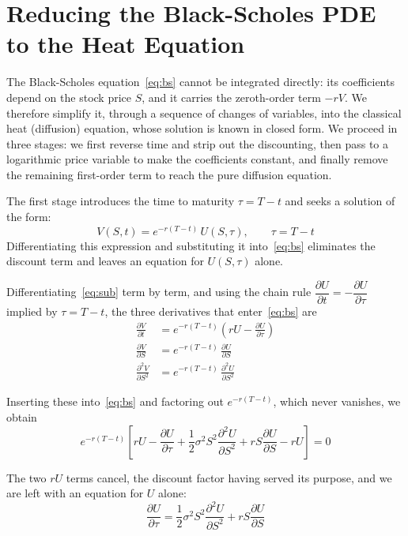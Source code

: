 \documentclass[a4paper,12pt]{article}
\numberwithin{equation}{section}
\begin{document}
\section{Reducing the Black-Scholes PDE to the Heat Equation}

The Black-Scholes equation~\eqref{eq:bs} cannot be integrated directly: its
coefficients depend on the stock price $S$, and it carries the zeroth-order term
$-rV$. We therefore simplify it, through a sequence of changes of variables, into
the classical heat (diffusion) equation, whose solution is known in closed form.
We proceed in three stages: we first reverse time and strip out the discounting,
then pass to a logarithmic price variable to make the coefficients constant, and
finally remove the remaining first-order term to reach the pure diffusion
equation.

The first stage introduces the time to maturity $\tau = T - t$ and seeks a
solution of the form:
\begin{equation}\label{eq:sub}
  V(S,t) = e^{-r(T-t)}\,U(S,\tau), \qquad \tau = T - t 
\end{equation}
Differentiating this expression and substituting it into~\eqref{eq:bs}
eliminates the discount term and leaves an equation for $U(S,\tau)$ alone.

Differentiating~\eqref{eq:sub} term by term, and using the chain rule
$\dfrac{\partial U}{\partial t} = -\dfrac{\partial U}{\partial \tau}$ implied by
$\tau = T - t$, the three derivatives that enter~\eqref{eq:bs} are
\begin{align}
  \frac{\partial V}{\partial t}
    &= e^{-r(T-t)}\left( rU - \frac{\partial U}{\partial \tau} \right) \\[4pt]
  \frac{\partial V}{\partial S}
    &= e^{-r(T-t)}\,\frac{\partial U}{\partial S} \\[4pt]
  \frac{\partial^2 V}{\partial S^2}
    &= e^{-r(T-t)}\,\frac{\partial^2 U}{\partial S^2} 
\end{align}

Inserting these into~\eqref{eq:bs} and factoring out $e^{-r(T-t)}$, which never
vanishes, we obtain
\begin{equation}
  e^{-r(T-t)}\left[
    rU - \frac{\partial U}{\partial \tau}
    + \frac{1}{2}\sigma^2 S^2\frac{\partial^2 U}{\partial S^2}
    + rS\frac{\partial U}{\partial S} - rU
  \right] = 0 
\end{equation}

The two $rU$ terms cancel, the discount factor having served its purpose, and we
are left with an equation for $U$ alone:
\begin{equation}\label{eq:Ueq}
  \frac{\partial U}{\partial \tau}
    = \frac{1}{2}\sigma^2 S^2\frac{\partial^2 U}{\partial S^2}
    + rS\frac{\partial U}{\partial S} 
\end{equation}
\end{document}
